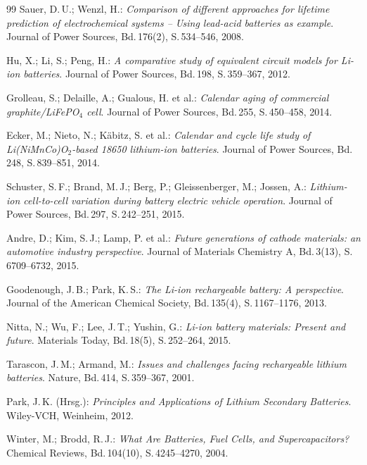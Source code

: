 ﻿\documentclass[a4paper,12pt]{article}
\theoremstyle{definition}
\begin{document}
\begin{thebibliography}{99}
  Sauer, D.\,U.; Wenzl, H.:
  \emph{Comparison of different approaches for lifetime prediction of
    electrochemical systems -- Using lead-acid batteries as example}.
  Journal of Power Sources, Bd.\,176(2), S.\,534--546, 2008.

  Hu, X.; Li, S.; Peng, H.:
  \emph{A comparative study of equivalent circuit models for Li-ion batteries}.
  Journal of Power Sources, Bd.\,198, S.\,359--367, 2012.

  Grolleau, S.; Delaille, A.; Gualous, H. et al.:
  \emph{Calendar aging of commercial graphite/LiFePO$_4$ cell}.
  Journal of Power Sources, Bd.\,255, S.\,450--458, 2014.

  Ecker, M.; Nieto, N.; K\"abitz, S. et al.:
  \emph{Calendar and cycle life study of Li(NiMnCo)O$_2$-based
    18650 lithium-ion batteries}.
  Journal of Power Sources, Bd.\,248, S.\,839--851, 2014.

  Schuster, S.\,F.; Brand, M.\,J.; Berg, P.; Gleissenberger, M.;
  Jossen, A.:
  \emph{Lithium-ion cell-to-cell variation during battery electric vehicle
    operation}.
  Journal of Power Sources, Bd.\,297, S.\,242--251, 2015.

  Andre, D.; Kim, S.\,J.; Lamp, P. et al.:
  \emph{Future generations of cathode materials: an automotive industry
    perspective}.
  Journal of Materials Chemistry A, Bd.\,3(13), S.\,6709--6732, 2015.

  Goodenough, J.\,B.; Park, K.\,S.:
  \emph{The Li-ion rechargeable battery: A perspective}.
  Journal of the American Chemical Society, Bd.\,135(4), S.\,1167--1176,
  2013.

  Nitta, N.; Wu, F.; Lee, J.\,T.; Yushin, G.:
  \emph{Li-ion battery materials: Present and future}.
  Materials Today, Bd.\,18(5), S.\,252--264, 2015.

  Tarascon, J.\,M.; Armand, M.:
  \emph{Issues and challenges facing rechargeable lithium batteries}.
  Nature, Bd.\,414, S.\,359--367, 2001.

  Park, J.\,K. (Hrsg.):
  \emph{Principles and Applications of Lithium Secondary Batteries}.
  Wiley-VCH, Weinheim, 2012.

  Winter, M.; Brodd, R.\,J.:
  \emph{What Are Batteries, Fuel Cells, and Supercapacitors?}
  Chemical Reviews, Bd.\,104(10), S.\,4245--4270, 2004.

\end{thebibliography}
\end{document}
